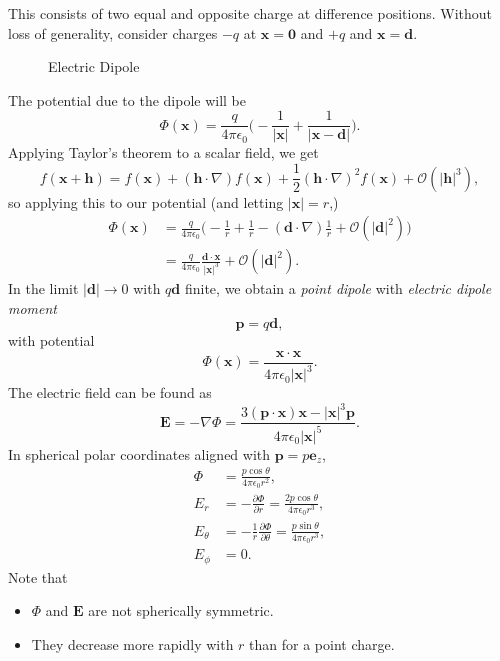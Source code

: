 \documentclass[12pt]{article}
\begin{document}
This consists of two equal and opposite charge at difference positions. Without loss of generality, consider charges $-q$ at $\mathbf{x} = \mathbf{0}$ and $+q$ and $\mathbf{x} = \mathbf{d}$.

\begin{figure}[h]
	\centering
	\caption{Electric Dipole}
	\label{fig:electric_dipole}
	\vspace{1em}
\end{figure}

The potential due to the dipole will be
\[
\Phi(\mathbf{x}) = \frac{q}{4 \pi \epsilon_0} \biggl( - \frac{1}{|\mathbf{x}|} + \frac{1}{|\mathbf{x} - \mathbf{d}|} \biggr)
.\]
Applying Taylor's theorem to a scalar field, we get
\[
f(\mathbf{x} + \mathbf{h}) = f(\mathbf{x}) + (\mathbf{h} \cdot \nabla) f(\mathbf{x}) + \frac{1}{2} (\mathbf{h} \cdot \nabla)^2 f(\mathbf{x}) + \mathcal{O}(|\mathbf{h}|^3)
,\]
so applying this to our potential (and letting $|\mathbf{x}| = r$,)
\begin{align*}
	\Phi(\mathbf{x}) &= \frac{q}{4 \pi \epsilon_0} \biggl( -\frac{1}{r} + \frac{1}{r} - (\mathbf{d} \cdot \nabla) \frac{1}{r} + \mathcal{O}(|\mathbf{d}|^2)\biggr) \\
			 &= \frac{q}{4 \pi \epsilon_0} \frac{\mathbf{d} \cdot \mathbf{x}}{|\mathbf{x}|^3} + \mathcal{O}(|\mathbf{d}|^2).
\end{align*}
In the limit $|\mathbf{d}| \to 0$ with $q \mathbf{d}$ finite, we obtain a \emph{point dipole} with \emph{electric dipole moment}
\[
\mathbf{p} = q \mathbf{d}
,\]
with potential
\[
\Phi(\mathbf{x}) = \frac{\mathbf{x} \cdot \mathbf{x}}{4 \pi \epsilon_0 |\mathbf{x}|^3}
.\]
The electric field can be found as
\[
\mathbf{E} = - \nabla \Phi = \frac{3(\mathbf{p} \cdot \mathbf{x})\mathbf{x} - |\mathbf{x}|^3 \mathbf{p}}{4 \pi \epsilon_0 |\mathbf{x}|^{5}}
.\]
In spherical polar coordinates aligned with $\mathbf{p}= p \mathbf{e}_z$,
\begin{align*}
	\Phi &= \frac{p \cos \theta}{4 \pi \epsilon_0 r^2}, \\
	E_r &= - \frac{\partial \Phi}{\partial r} = \frac{2 p \cos \theta}{4 \pi \epsilon_0 r^3}, \\
	E_\theta &= - \frac{1}{r} \frac{\partial \Phi}{\partial \theta} = \frac{p \sin \theta}{4 \pi \epsilon_0 r^3}, \\
	E_\phi &= 0.
\end{align*}
Note that
\begin{itemize}
	\item $\Phi$ and $\mathbf{E}$ are not spherically symmetric.
	\item They decrease more rapidly with $r$ than for a point charge.
\end{itemize}
\end{document}
